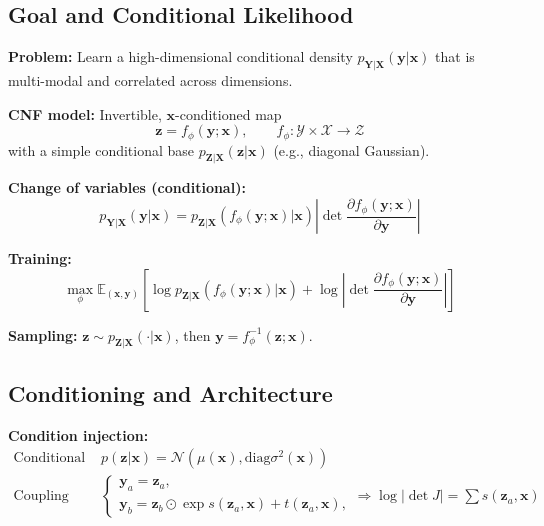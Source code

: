 \subsection{Goal and Conditional Likelihood}

\textbf{Problem:} Learn a high-dimensional conditional density $p_{\mathbf{Y}|\mathbf{X}}(\mathbf{y}|\mathbf{x})$ that is multi-modal and correlated across dimensions.

\textbf{CNF model:} Invertible, $\mathbf{x}$-conditioned map
\begin{equation}
    \mathbf{z} = f_\phi(\mathbf{y}; \mathbf{x}), \qquad f_\phi:\mathcal{Y}\times \mathcal{X}\to \mathcal{Z}
\end{equation}
with a simple conditional base $p_{\mathbf{Z}|\mathbf{X}}(\mathbf{z}|\mathbf{x})$ (e.g., diagonal Gaussian).

\textbf{Change of variables (conditional):}
\begin{equation}
    p_{\mathbf{Y}|\mathbf{X}}(\mathbf{y}|\mathbf{x}) = p_{\mathbf{Z}|\mathbf{X}}(f_\phi(\mathbf{y};\mathbf{x})|\mathbf{x}) \left|\det \frac{\partial f_\phi(\mathbf{y};\mathbf{x})}{\partial \mathbf{y}}\right|
\end{equation}

\textbf{Training:}
\begin{equation}
    \max_\phi \mathbb{E}_{(\mathbf{x},\mathbf{y})}\left[\log p_{\mathbf{Z}|\mathbf{X}}(f_\phi(\mathbf{y};\mathbf{x})|\mathbf{x}) + \log \left| \det \frac{\partial f_\phi(\mathbf{y};\mathbf{x})}{\partial \mathbf{y}} \right|\right]
\end{equation}

\textbf{Sampling:} $\mathbf{z}\sim p_{\mathbf{Z}|\mathbf{X}}(\cdot|\mathbf{x})$, then $\mathbf{y}= f_\phi^{-1}(\mathbf{z};\mathbf{x})$.

\subsection{Conditioning and Architecture}

\textbf{Condition injection:}
\begin{align}
    \text{Conditional prior: } & p(\mathbf{z}|\mathbf{x})=\mathcal{N}(\mu(\mathbf{x}), \text{diag}\sigma^2(\mathbf{x}))\\
    \text{Coupling (affine): } &
    \begin{cases}
        \mathbf{y}_a = \mathbf{z}_a, \\
        \mathbf{y}_b = \mathbf{z}_b \odot \exp s(\mathbf{z}_a,\mathbf{x}) + t(\mathbf{z}_a,\mathbf{x}),
    \end{cases}
    \Rightarrow \log|\det J|=\sum s(\mathbf{z}_a,\mathbf{x})
\end{align}

